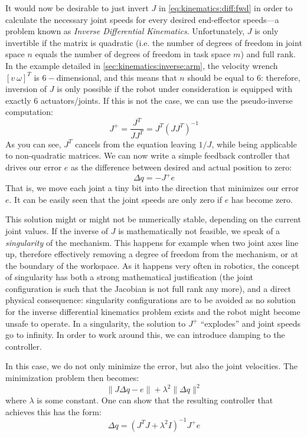 It would now be desirable to just invert $J$ in \cref{eq:kinematics:diff:fwd} in order to calculate the necessary joint speeds for every desired end-effector speeds---a problem known as \textsl{Inverse Differential Kinematics}. Unfortunately, $J$ is only invertible if the matrix is quadratic (i.e. the number of degrees of freedom in joint space $n$ equals the number of degrees of freedom in task space $m$) and full rank.
In the example detailed in \cref{sec:kinematics:inverse:arm}, the velocity wrench $[v \ \omega]^T$ is $6-$dimensional, and this means that $n$ should be equal to $6$: therefore, inversion of $J$ is only possible if the robot under consideration is equipped with exactly $6$ actuators/joints.
If this is not the case, we can use the pseudo-inverse computation:
\begin{equation}
J^+=\frac{J^T}{JJ^T}=J^T(JJ^T)^{-1}\label{eq:kinematics:diff:pseudoinverse}
\end{equation}
As you can see, $J^T$ cancels from the equation leaving $1/J$, while being applicable to non-quadratic matrices.
We can now write a simple feedback controller that drives our error $e$ as the difference between desired and actual position to zero:
\begin{equation}
\Delta{q}=-J^+e
\end{equation}
That is, we move each joint a tiny bit into the direction that minimizes our error $e$.
It can be easily seen that the joint speeds are only zero if $e$ has become zero.

This solution might or might not be numerically stable, depending on the current joint values. If the inverse of $J$ is mathematically not feasible, we speak of a \textsl{singularity} of the mechanism. This happens for example when two joint axes line up, therefore effectively removing a degree of freedom from the mechanism, or at the boundary of the workspace. As it happens very often in robotics, the concept of singularity has both a strong mathematical justification (the joint configuration is such that the Jacobian is not full rank any more), and a direct physical consequence: singularity configurations are to be avoided as no solution for the inverse differential kinematics problem exists and the robot might become unsafe to operate.
In a singularity, the solution to $ J^+$ ``explodes'' and joint speeds go to infinity. In order to work around this, we can introduce damping to the controller.

In this case, we do not only minimize the error, but also the joint velocities. The minimization problem then becomes:
\begin{equation}
\|J\Delta q-e\|+\lambda^2\|\Delta q\|^2
\end{equation}
where $\lambda$ is some constant. One can show that the resulting controller that achieves this has the form:
\begin{equation}
\Delta q=(J^TJ+\lambda^2 I)^{-1}J^+e
\end{equation}

